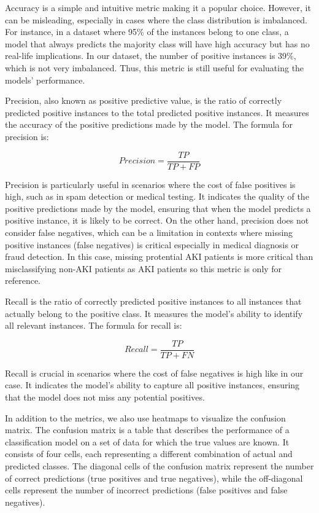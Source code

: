\documentclass[../main.tex]{subfiles}
\begin{document}
Accuracy is a simple and intuitive metric making it a popular choice.
However, it can be misleading, especially in cases where the class distribution is imbalanced.
For instance, in a dataset where 95\% of the instances belong to one class, a model that always predicts the majority class will have high accuracy but has no real-life implications.
In our dataset, the number of positive instances is 39\%, which is not very imbalanced.
Thus, this metric is still useful for evaluating the models' performance.

Precision, also known as positive predictive value, is the ratio of correctly predicted positive instances to the total predicted positive instances. It measures the accuracy of the positive predictions made by the model. The formula for precision is:

\begin{equation}
    \label{eq:precision}
    Precision = \frac{TP}{TP + FP}
\end{equation}

Precision is particularly useful in scenarios where the cost of false positives is high, such as in spam detection or medical testing.
It indicates the quality of the positive predictions made by the model, ensuring that when the model predicts a positive instance, it is likely to be correct.
On the other hand, precision does not consider false negatives, which can be a limitation in contexts where missing positive instances (false negatives) is critical especially in medical diagnosis or fraud detection.
In this case, missing protential \gls{AKI} patients is more critical than misclassifying non-AKI patients as \gls{AKI} patients so this metric is only for reference.

Recall is the ratio of correctly predicted positive instances to all instances that actually belong to the positive class.
It measures the model's ability to identify all relevant instances.
The formula for recall is:

\begin{equation}
    \label{eq:recall}
    Recall = \frac{TP}{TP + FN}
\end{equation}

Recall is crucial in scenarios where the cost of false negatives is high like in our case.
It indicates the model's ability to capture all positive instances, ensuring that the model does not miss any potential positives.

In addition to the metrics, we also use heatmaps to visualize the confusion matrix.
The confusion matrix is a table that describes the performance of a classification model on a set of data for which the true values are known.
It consists of four cells, each representing a different combination of actual and predicted classes.
The diagonal cells of the confusion matrix represent the number of correct predictions (true positives and true negatives), while the off-diagonal cells represent the number of incorrect predictions (false positives and false negatives).
\end{document}
